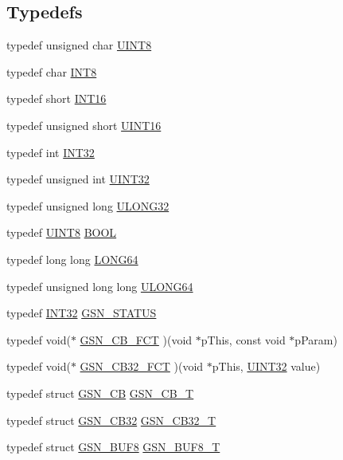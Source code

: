 \subsection*{Typedefs}
\begin{DoxyCompactItemize}
\item 
typedef unsigned char \hyperlink{a00660_gab27e9918b538ce9d8ca692479b375b6a}{UINT8}
\item 
typedef char \hyperlink{a00660_ga307b8734c020247f6bac4fcde0dcfbb9}{INT8}
\item 
typedef short \hyperlink{a00660_ga57de7cb8e702b1746127a4d5137fa455}{INT16}
\item 
typedef unsigned short \hyperlink{a00660_ga09f1a1fb2293e33483cc8d44aefb1eb1}{UINT16}
\item 
typedef int \hyperlink{a00660_ga63021d67d54286c2163bcdb43a6f2569}{INT32}
\item 
typedef unsigned int \hyperlink{a00660_gae1e6edbbc26d6fbc71a90190d0266018}{UINT32}
\item 
typedef unsigned long \hyperlink{a00660_gaa4ee7c96d5dff444cca1bf965c9f77fd}{ULONG32}
\item 
typedef \hyperlink{a00660_gab27e9918b538ce9d8ca692479b375b6a}{UINT8} \hyperlink{a00660_ga1f04022c0a182c51c059438790ea138c}{BOOL}
\item 
typedef long long \hyperlink{a00660_gae57305825c7d329ad8a3065ae045e875}{LONG64}
\item 
typedef unsigned long long \hyperlink{a00660_ga28961430434ccabca6862ea93fe9a15b}{ULONG64}
\item 
typedef \hyperlink{a00660_ga63021d67d54286c2163bcdb43a6f2569}{INT32} \hyperlink{a00660_gada5951904ac6110b1fa95e51a9ddc217}{GSN\_\-STATUS}
\item 
typedef void($\ast$ \hyperlink{a00599_ac4c0c28469f0b55f25aa4c54e7eefdc2}{GSN\_\-CB\_\-FCT} )(void $\ast$pThis, const void $\ast$pParam)
\item 
typedef void($\ast$ \hyperlink{a00599_ab4bad69dbb3955c389ce748612ed9ba4}{GSN\_\-CB32\_\-FCT} )(void $\ast$pThis, \hyperlink{a00660_gae1e6edbbc26d6fbc71a90190d0266018}{UINT32} value)
\item 
typedef struct \hyperlink{a00036}{GSN\_\-CB} \hyperlink{a00599_a7db24ea278c4ee3f84be794922ac3014}{GSN\_\-CB\_\-T}
\item 
typedef struct \hyperlink{a00037}{GSN\_\-CB32} \hyperlink{a00599_ad6498a464c109edb4fb99f43db8ae490}{GSN\_\-CB32\_\-T}
\item 
typedef struct \hyperlink{a00033}{GSN\_\-BUF8} \hyperlink{a00654_ga5ae3d391ff074ccd3582b1ece95b3424}{GSN\_\-BUF8\_\-T}

\end{DoxyCompactItemize}

